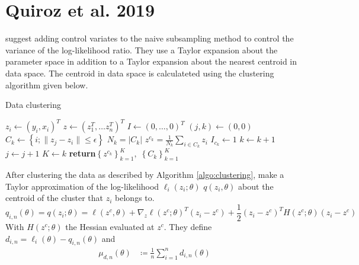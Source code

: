 {\section{Quiroz et al. 2019}
\cite{quiroz2019speeding} suggest adding control variates to the naive subsampling method to control the variance of the log-likelihood ratio. They use a Taylor expansion about the parameter space in addition to a Taylor expansion about the nearest centroid in data space. The centroid in data space is calculateted using the clustering algorithm given below. 
\begin{algorithm}
\caption{Data clustering}
\label{algo:clustering}
\begin{algorithmic}[1]
    \State $z_i \gets \left(y_i, x_i\right)^T$
    \State $z \gets \left(z_1^T, \ldots z_n^T\right)^T $
    \State $I \gets \left(0, \ldots, 0\right)^T$ 
    \State $\left(j,k\right) \gets \left(0,0\right)$
    \State $C_k \gets \left\{i; \lVert z_j - z_i \rVert \leq \epsilon\right\}  $
    \State $N_k = \left| C_k\right|$ 
    \State $z^{c_k} = \frac{1}{N_k} \sum_{i\in C_k} z_i$
    \State $I_{c_k} \gets 1$
    \State $k\gets k+1$
    \EndIf
    \State $j \gets j+1$
    \EndWhile
    \State $K\gets k$
    \State \textbf{return}$\left\{z^{c_k}\right\}_{k = 1}^K, \; \left\{C_k\right\}_{k=1}^K$
    \EndFunction
    \end{algorithmic}
\end{algorithm}{}
After clustering the data as described by Algorithm \ref{algo:clustering}, \cite{quiroz2019speeding} make a Taylor approximation of the log-likelihood $\ell_i\left(z_i;\theta\right)$ $q\left(z_i, \theta\right)$ about the centroid of the cluster that $z_i$ belongs to.  
\begin{equation}
    q_{i, n}\left(\theta\right) = q\left(z_i;\theta\right) = \ell\left(z^c, \theta\right) + \nabla_z \ell\left(z^c; \theta\right)^T \left(z_i - z^c \right) + \frac{1}{2}\left(z_i - z^c\right)^T H\left(z^c;\theta\right)\left(z_i - z^c\right)
\end{equation}
With $H\left(z^c; \theta\right)$ the Hessian evaluated at $z^c$. 
They define $d_{i, n} = \ell_i\left(\theta\right) - q_{i,n}\left(\theta\right)$ and 
\begin{equation*}
\begin{split}
    \mu_{d,n}\left(\theta\right) &\coloneqq \frac{1}{n}\sum_{i = 1}^n d_{i,n}\left(\theta\right) \\

\end{split}
\end{equation*}}
